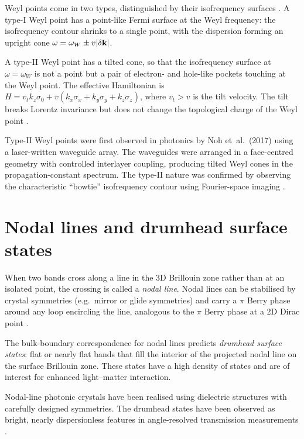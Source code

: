 Weyl points come in two types, distinguished by their isofrequency
surfaces \cite{chen2021ideal}.  A type-I Weyl point has a point-like Fermi surface at the
Weyl frequency: the isofrequency contour shrinks to a single point,
with the dispersion forming an upright cone
$\omega=\omega_W\pm v|\delta\mathbf{k}|$.

A type-II Weyl point has a tilted cone, so that the isofrequency
surface at $\omega=\omega_W$ is not a point but a pair of electron-
and hole-like pockets touching at the Weyl point.  The effective
Hamiltonian is
$H=v_t k_z\sigma_0 + v(k_x\sigma_x+k_y\sigma_y+k_z\sigma_z)$,
where $v_t>v$ is the tilt velocity.  The tilt breaks Lorentz
invariance but does not change the topological charge of the Weyl
point \cite{noh2017experimental,ozawa2018topological}.

Type-II Weyl points were first observed in photonics by Noh et~al.\
(2017) using a laser-written waveguide array.  The waveguides were
arranged in a face-centred geometry with controlled interlayer
coupling, producing tilted Weyl cones in the propagation-constant
spectrum.  The type-II nature was confirmed by observing the
characteristic ``bowtie'' isofrequency contour using Fourier-space
imaging \cite{noh2017experimental}.

\section{Nodal lines and drumhead surface states}
\label{sec:ch15-nodal-lines-drumhead}

When two bands cross along a line in the 3D Brillouin zone rather
than at an isolated point, the crossing is called a \emph{nodal line}.
Nodal lines can be stabilised by crystal symmetries (e.g.\ mirror or
glide symmetries) and carry a $\pi$ Berry phase around any loop
encircling the line, analogous to the $\pi$ Berry phase at a 2D Dirac
point \cite{kim2015dirac,ozawa2018topological}.

The bulk-boundary correspondence for nodal lines predicts
\emph{drumhead surface states}: flat or nearly flat bands that fill
the interior of the projected nodal line on the surface Brillouin
zone.  These states have a high density of states and are of interest
for enhanced light--matter interaction.

Nodal-line photonic crystals have been realised using dielectric
structures with carefully designed symmetries.  The drumhead states
have been observed as bright, nearly dispersionless features in
angle-resolved transmission measurements
\cite{price2022roadmap}.

